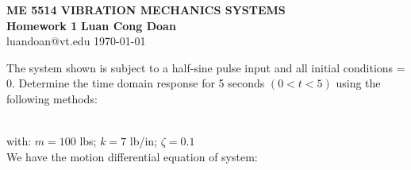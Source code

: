 \documentclass[14pt,a4paper]{article}
\begin{document}
\label{cover}
\begin{center}
	\vspace*{3cm}
	\large{\textbf{ME 5514 VIBRATION MECHANICS SYSTEMS \\ Homework 1}}
	\vfill
	\textbf{Luan Cong Doan} \\ luandoan@vt.edu
	\vfill
	\today
\end{center}

\label{Answer Sheet}
\label{Vibration Mechanics}
\doublespacing
The system shown is subject to a half-sine pulse input and all initial conditions = 0. Determine the time domain response for 5 seconds $(0 < t < 5)$ using the following methods:\\
\begin{figure}[htp]
	\centering
	\hfill
\end{figure}\\
with: $m = 100$ lbs; $k = 7$ lb/in; $\zeta = 0.1$\\
\doublespacing
We have the motion differential equation of system:\\
\end{document}
